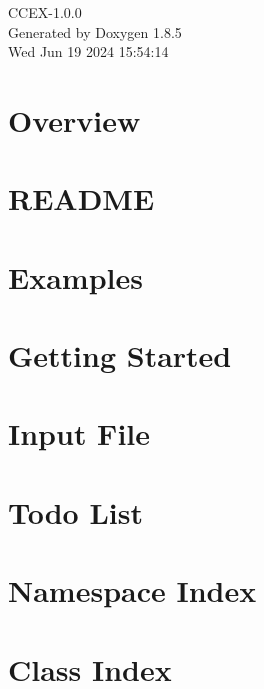 \documentclass[twoside]{book}
\newcommand{\clearemptydoublepage}{%
  \newpage{\pagestyle{empty}\cleardoublepage}%
}
\begin{document}
\hypersetup{pageanchor=false}
\begin{titlepage}
\vspace*{7cm}
\begin{center}%
{\Large C\-C\-E\-X-\/1.0.0 }\\
\vspace*{1cm}
{\large Generated by Doxygen 1.8.5}\\
\vspace*{0.5cm}
{\small Wed Jun 19 2024 15:54:14}\\
\end{center}
\end{titlepage}
\clearemptydoublepage
\tableofcontents
\clearemptydoublepage
{}
\hypersetup{pageanchor=true}

\chapter{Overview}
\label{index}\hypertarget{index}{}
\chapter{R\-E\-A\-D\-M\-E}
\label{md__home_huijin_git_CCEX_README}
\hypertarget{md__home_huijin_git_CCEX_README}{}

\chapter{Examples}
\label{Examples}
\hypertarget{Examples}{}

\chapter{Getting Started}
\label{GettingStarted}
\hypertarget{GettingStarted}{}

\chapter{Input File}
\label{InputFile}
\hypertarget{InputFile}{}

\chapter{Todo List}
\label{todo}
\hypertarget{todo}{}

\chapter{Namespace Index}

\chapter{Class Index}

\end{document}
